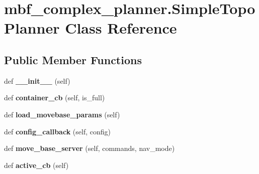 \hypertarget{classmbf__complex__planner_1_1SimpleTopoPlanner}{}\section{mbf\+\_\+complex\+\_\+planner.\+Simple\+Topo\+Planner Class Reference}
\label{classmbf__complex__planner_1_1SimpleTopoPlanner}
\subsection*{Public Member Functions}
\begin{DoxyCompactItemize}
\item 
\mbox{\label{classmbf__complex__planner_1_1SimpleTopoPlanner_a72330ca8f10eeeb446663623aa930e12}} 
def {\bfseries \+\_\+\+\_\+init\+\_\+\+\_\+} (self)
\item 
\mbox{\label{classmbf__complex__planner_1_1SimpleTopoPlanner_aff8d779274db6db0f2b3d5eb49952638}} 
def {\bfseries container\+\_\+cb} (self, is\+\_\+full)
\item 
\mbox{\label{classmbf__complex__planner_1_1SimpleTopoPlanner_adb0633463b52460555688439eeb13f3b}} 
def {\bfseries load\+\_\+movebase\+\_\+params} (self)
\item 
\mbox{\label{classmbf__complex__planner_1_1SimpleTopoPlanner_a64668d39e5f4ee3502473920e5e7e62e}} 
def {\bfseries config\+\_\+callback} (self, config)
\item 
\mbox{\label{classmbf__complex__planner_1_1SimpleTopoPlanner_a81b512c2eaefa41a43b809b6a361f8a0}} 
def {\bfseries move\+\_\+base\+\_\+server} (self, commands, nav\+\_\+mode)
\item 
\mbox{\label{classmbf__complex__planner_1_1SimpleTopoPlanner_ab8d7a141999fa9f49490dec83eb543e2}} 
def {\bfseries active\+\_\+cb} (self)
\item 
\mbox{\label{classmbf__complex__planner_1_1SimpleTopoPlanner_a7b52214fb5bd624ac1969ac3320bc881}} 

\end{DoxyCompactItemize}
